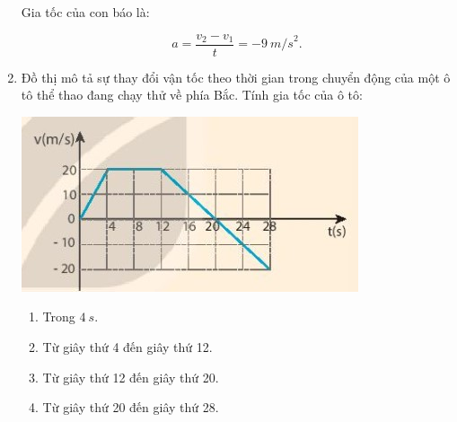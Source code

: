 \begin{enumerate}[label=\bfseries Bài \arabic*:]
{		Gia tốc của con báo là:
		
		$$a = \dfrac{v_2 - v_1}{t} = - \SI{9}{m/s}^2.$$
	}
	\item {}
	
	{
		
		Đồ thị mô tả sự thay đổi vận tốc theo thời gian trong chuyển động của một ô tô thể thao đang chạy thử về phía Bắc. Tính gia tốc của ô tô:
		\begin{center}
			\includegraphics[scale=1]{../figs/VN10-2022-PH-TP007-3.jpg}
		\end{center}
		
		\begin{enumerate}[label=\alph*)]
			\item Trong $\SI{4}{s}$.
			\item Từ giây thứ 4 đến giây thứ 12.
			\item Từ giây thứ 12 đến giây thứ 20.
			\item Từ giây thứ 20 đến giây thứ 28.
		\end{enumerate}
	}
	

\end{enumerate}

